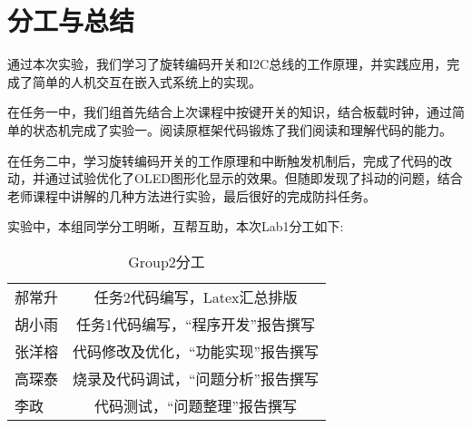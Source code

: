 \section{分工与总结}
\par{通过本次实验，我们学习了旋转编码开关和I2C总线的工作原理，并实践应用，完成了简单的人机交互在嵌入式系统上的实现。}
\par{在任务一中，我们组首先结合上次课程中按键开关的知识，结合板载时钟，通过简单的状态机完成了实验一。阅读原框架代码锻炼了我们阅读和理解代码的能力。}
\par{在任务二中，学习旋转编码开关的工作原理和中断触发机制后，完成了代码的改动，并通过试验优化了OLED图形化显示的效果。但随即发现了抖动的问题，结合老师课程中讲解的几种方法进行实验，最后很好的完成防抖任务。}
\par{实验中，本组同学分工明晰，互帮互助，本次Lab1分工如下:}
\begin{table}[h]
	\centering
	\begin{tabular}{|l|c|}
		郝常升&任务2代码编写，Latex汇总排版\\
		胡小雨&任务1代码编写，“程序开发”报告撰写\\
		张洋榕&代码修改及优化，“功能实现”报告撰写\\
		高琛泰&烧录及代码调试，“问题分析”报告撰写\\
		李政&代码测试，“问题整理”报告撰写\\
	\end{tabular}
	\caption{Group2分工}
	\label{tab:Margin_settings}
\end{table}